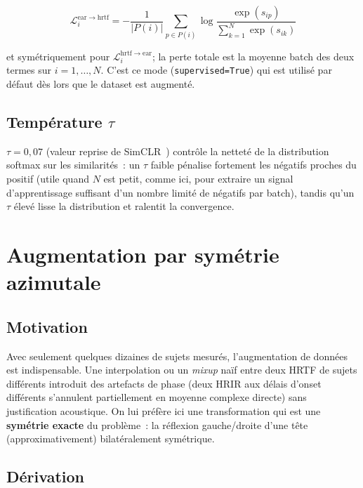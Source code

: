 \documentclass[12pt, a4paper]{article}
\begin{document}
\begin{equation}
    \mathcal{L}_i^{\mathrm{ear}\to\mathrm{hrtf}}
    = -\frac{1}{|P(i)|}\sum_{p\in P(i)}
    \log \frac{\exp(s_{ip})}{\sum_{k=1}^N \exp(s_{ik})}
    \label{eq:sup-ntxent}
\end{equation}

et symétriquement pour $\mathcal{L}_i^{\mathrm{hrtf}\to\mathrm{ear}}$; la
perte totale est la moyenne batch des deux termes sur $i=1,\dots,N$. C'est
ce mode (\texttt{supervised=True}) qui est utilisé par défaut dès lors que
le dataset est augmenté.

\subsection{Température $\tau$}

$\tau=0{,}07$ (valeur reprise de SimCLR~\cite{Chen19}) contrôle la netteté
de la distribution softmax sur les similarités~: un $\tau$ faible pénalise
fortement les négatifs proches du positif (utile quand $N$ est petit, comme
ici, pour extraire un signal d'apprentissage suffisant d'un nombre limité
de négatifs par batch), tandis qu'un $\tau$ élevé lisse la distribution et
ralentit la convergence.

\section{Augmentation par symétrie azimutale}
\label{sec:augmentation}

\subsection{Motivation}

Avec seulement quelques dizaines de sujets mesurés, l'augmentation de
données est indispensable. Une interpolation ou un \textit{mixup} naïf
entre deux HRTF de sujets différents introduit des artefacts de phase
(deux HRIR aux délais d'onset différents s'annulent partiellement en
moyenne complexe directe) sans justification acoustique. On lui préfère
ici une transformation qui est une \textbf{symétrie exacte} du problème~:
la réflexion gauche/droite d'une tête (approximativement) bilatéralement
symétrique.

\subsection{Dérivation}
\end{document}
